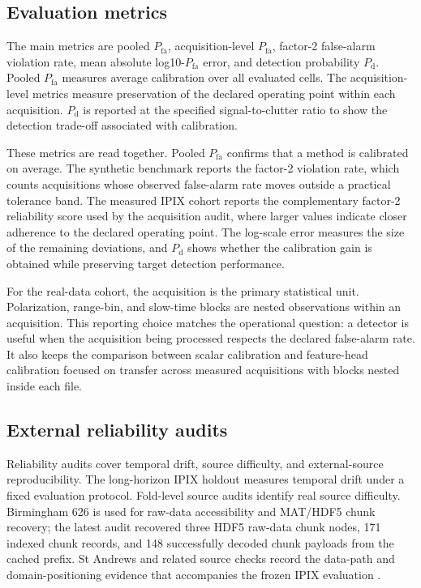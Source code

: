 \documentclass[preprint,12pt]{elsarticle}
\begin{document}
\subsection{Evaluation metrics}
\label{subsec:experiment-metrics}

The main metrics are pooled $P_{\mathrm{fa}}$, acquisition-level
$P_{\mathrm{fa}}$, factor-2 false-alarm violation rate, mean absolute
log10-$P_{\mathrm{fa}}$ error, and detection probability $P_{\mathrm{d}}$.
Pooled $P_{\mathrm{fa}}$ measures average calibration over all evaluated cells.
The acquisition-level metrics measure preservation of the declared operating
point within each acquisition. $P_{\mathrm{d}}$ is reported at the specified
signal-to-clutter ratio to show the detection trade-off associated with
calibration.

These metrics are read together. Pooled $P_{\mathrm{fa}}$ confirms that a method
is calibrated on average. The synthetic benchmark reports the factor-2
violation rate, which counts acquisitions whose observed false-alarm rate moves
outside a practical tolerance band. The measured IPIX cohort reports the
complementary factor-2 reliability score used by the acquisition audit, where
larger values indicate closer adherence to the declared operating point. The
log-scale error measures the size of the remaining deviations, and
$P_{\mathrm{d}}$ shows whether the calibration gain is obtained while
preserving target detection performance.

For the real-data cohort, the acquisition is the primary statistical unit.
Polarization, range-bin, and slow-time blocks are nested observations within an
acquisition. This reporting choice matches the operational question: a detector
is useful when the acquisition being processed respects the declared false-alarm
rate. It also keeps the comparison between scalar calibration and feature-head
calibration focused on transfer across measured acquisitions with blocks nested
inside each file.

\subsection{External reliability audits}
\label{subsec:external}

Reliability audits cover temporal drift, source difficulty, and external-source
reproducibility. The long-horizon IPIX holdout measures temporal drift under a
fixed evaluation protocol. Fold-level source audits identify real source
difficulty. Birmingham 626 is used for raw-data accessibility and MAT/HDF5
chunk recovery; the latest audit recovered three HDF5 raw-data chunk nodes, 171
indexed chunk records, and 148 successfully decoded chunk payloads from the
cached prefix. St Andrews and related source checks record the data-path and
domain-positioning evidence that accompanies the frozen IPIX evaluation
\cite{birmingham626,remote2019realistic,hamidi2024target}.
\end{document}
